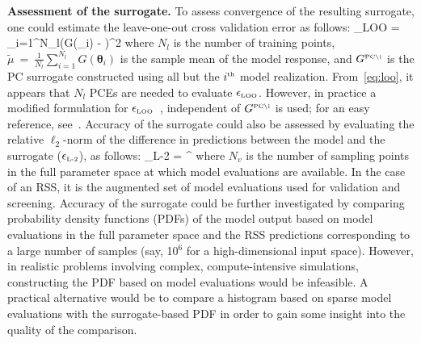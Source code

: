 \textbf{Assessment of the surrogate.}
To assess convergence of the resulting surrogate, one could estimate the
leave-one-out cross validation error as follows:
\be
\epsilon_{\mbox{\tiny LOO}} = 
{\sum\limits_{i=1}^{N_l}\left(G(\bm{\theta}_i) - \widetilde{\mu}\right)^2}
\label{eq:loo}
\ee
where $N_l$ is the number of training points,
$\widetilde{\mu}~=~\frac{1}{N_l}\sum\limits_{i=1}^{N_l} G(\bm{\theta}_i)$ is
the sample mean of the model response, and $ G^{\mbox{\tiny {PC}\textbackslash
i}}$ is the PC surrogate constructed using all but the $i^{\mbox{\tiny{th}}}$
model realization.  From~\eqref{eq:loo}, it appears that $N_l$ PCEs are needed
to evaluate $\epsilon_{\mbox{\tiny LOO}}$.  However, in practice a modified
formulation for $\epsilon_{\mbox{\tiny LOO}}$~\cite{Blatman:2009}, independent
of $G^{\mbox{\tiny {PC}\textbackslash i}}$ is used; for an easy reference,
see~\cite[Eq.~(1.27)]{Marelli:2014}.  Accuracy of the surrogate could also 
be assessed by evaluating the relative $\ell_2$-norm of the difference in
predictions between the model and the surrogate ($\epsilon_{\mbox{\tiny{L-2}}}$), as follows:
\be
\epsilon_{\mbox{\tiny{L-2}}} = 
{\left[\sum\limits_{i=1}^{N_v}\left(G(\bm{\theta}_i)\right)^2\right]^{}}
\label{eq:l2}
\ee
where $N_v$ is the number of sampling points in the full parameter space at
which model evaluations are available. In the case of an RSS, it is the
augmented set of model evaluations used for validation and screening.  
%
Accuracy of the surrogate could be further investigated by comparing
probability density functions (PDFs) of the model output based on model
evaluations in the full parameter space and the RSS predictions corresponding
to a large number of samples (say, 10$^6$ for a high-dimensional input space).
However, in realistic problems
involving complex, compute-intensive simulations, constructing the PDF based on model
evaluations would be infeasible.  A practical alternative would be to compare
a histogram based on sparse model evaluations with the surrogate-based PDF in
order to gain some insight into the quality of the comparison. 

